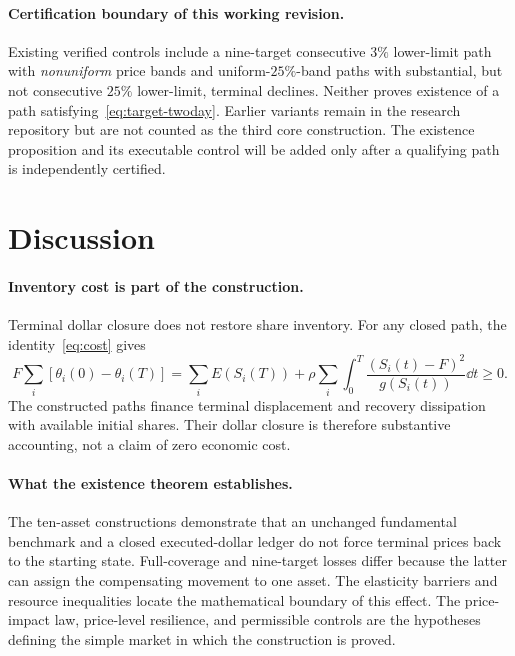 \documentclass[review,hidelinks,onefignum,onetabnum]{siamonline250211}
\begin{document}
\paragraph{Certification boundary of this working revision.}
Existing verified controls include a nine-target consecutive $3\%$ lower-limit path with \emph{nonuniform} price bands and uniform-$25\%$-band paths with substantial, but not consecutive $25\%$ lower-limit, terminal declines. Neither proves existence of a path satisfying~\eqref{eq:target-twoday}. Earlier variants remain in the research repository but are not counted as the third core construction. The existence proposition and its executable control will be added only after a qualifying path is independently certified.

\section{Discussion}\label{sec:discussion}
\paragraph{Inventory cost is part of the construction.}
Terminal dollar closure does not restore share inventory. For any closed path, the identity~\eqref{eq:cost} gives
\begin{equation}\label{eq:inventory-discussion}
 F\sum_i[\theta_i(0)-\theta_i(T)]
 =\sum_i E(S_i(T))
  +\rho\sum_i\int_0^T\frac{(S_i(t)-F)^2}{g(S_i(t))}\dd t\ge0.
\end{equation}
The constructed paths finance terminal displacement and recovery dissipation with available initial shares. Their dollar closure is therefore substantive accounting, not a claim of zero economic cost.

\paragraph{What the existence theorem establishes.}
The ten-asset constructions demonstrate that an unchanged fundamental benchmark and a closed executed-dollar ledger do not force terminal prices back to the starting state. Full-coverage and nine-target losses differ because the latter can assign the compensating movement to one asset. The elasticity barriers and resource inequalities locate the mathematical boundary of this effect. The price-impact law, price-level resilience, and permissible controls are the hypotheses defining the simple market in which the construction is proved.
\end{document}
